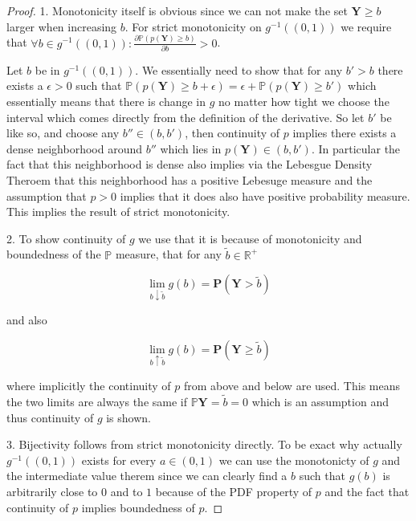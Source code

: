 \begin{proof}
    1. Monotonicity itself is obvious since we can not make the set $\mathbf{Y} \geq b$ larger when increasing $b$. For strict monotonicity on $g^{-1}((0,1))$ we require that $\forall b \in g^{-1}((0,1)): \frac{\partial \mathbb{P}(p(\mathbf{Y}) \geq b)}{\partial b} > 0$.

    Let $b$ be in $g^{-1}((0,1))$. We essentially need to show that for any $b' > b$ there exists a $\epsilon > 0$ such that $\mathbb{P}(p(\mathbf{Y}) \geq b + \epsilon) = \epsilon + \mathbb{P}(p(\mathbf{Y}) \geq b')$ which essentially means that there is change in $g$ no matter how tight we choose the interval which comes directly from the definition of the derivative. So let $b'$ be like so, and choose any $b'' \in (b, b')$, then continuity of $p$ implies there exists a dense neighborhood around $b''$ which lies in $p(\mathbf{Y}) \in (b, b')$. In particular the fact that this neighborhood is dense also implies via the Lebesgue Density Theroem that this neighborhood has a positive Lebesuge measure and the assumption that $p > 0$ implies that it does also have positive probability measure. This implies the result of strict monotonicity.

    2. To show continuity of $g$ we use that it is because of monotonicity and boundedness of the $\mathbb{P}$ measure, that for any $\tilde{b}\in\mathbb{R}^+$

    \begin{equation}
        \lim_{b \downarrow \tilde{b}} g(b) = \mathbf{P}(\mathbf{Y} > \tilde{b})
    \end{equation}

    and also

    \begin{equation}
        \lim_{b \uparrow \tilde{b}} g(b) = \mathbf{P}(\mathbf{Y} \geq \tilde{b})
    \end{equation}

    where implicitly the continuity of $p$ from above and below are used. This means the two limits are always the same if $\mathbb{P}{\mathbf{Y} = \tilde{b}} = 0$ which is an assumption and thus continuity of $g$ is shown.

    3. Bijectivity follows from strict monotonicity directly. To be exact why actually $g^{-1}((0,1))$ exists for every $a \in (0,1)$ we can use the monotonicty of $g$ and the intermediate value therem since we can clearly find a $b$ such that $g(b)$ is arbitrarily close to $0$ and to $1$ because of the PDF property of $p$ and the fact that continuity of $p$ implies boundedness of $p$.


\end{proof}
